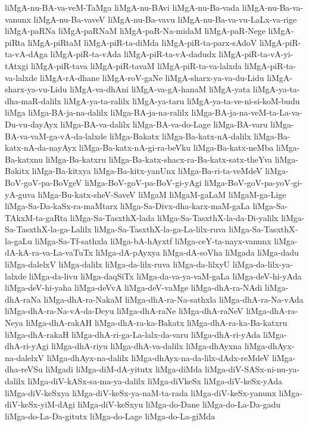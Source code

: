 {liMgA-nu-BA-va-veM-TaMga
liMgA-nu-BAvi
liMgA-nu-Ba-vada
liMgA-nu-Ba-va-vanunx
liMgA-nu-Ba-vaveV
liMgA-nu-Ba-vavu
liMgA-nu-Ba-va-vu-LaLx-va-rige
liMgA-paRNa
liMgA-paRNaM
liMgA-paR-Na-midaM
liMgA-paR-Nege
liMgA-piRta
liMgA-piRtaM
liMgA-piR-ta-diMda
liMgA-piR-ta-parx-sAdoV
liMgA-piR-ta-vA-dAga
liMgA-piR-ta-vAda
liMgA-piR-ta-vA-dadudx
liMgA-piR-ta-vA-yi-tAtxgi
liMgA-piR-tava
liMgA-piR-tavaM
liMgA-piR-ta-va-lalxda
liMgA-piR-ta-va-lalxde
liMgA-rA-dhane
liMgA-roV-gaNe
liMgA-sharx-ya-va-du-Lidu
liMgA-sharx-ya-vu-Lidu
liMgA-va-dhAni
liMgA-va-gA-hanaM
liMgA-yata
liMgA-ya-ta-dha-maR-dalilx
liMgA-ya-ta-ralilx
liMgA-ya-taru
liMgA-ya-ta-ve-ni-si-koM-budu
liMga
liMga-BA-ja-na-dalilx
liMga-BA-ja-na-ralilx
liMga-BA-ja-na-veM-ta-La-va-Du-vu-dayAyx
liMga-BA-va-dalilx
liMga-BA-va-do-Lage
liMga-BA-varu
liMga-BA-va-vaM-ga-vA-da-lalxde
liMga-Bakatx
liMga-Ba-katx-nA-dalilx
liMga-Ba-katx-nA-da-nayAyx
liMga-Ba-katx-nA-gi-ra-beVku
liMga-Ba-katx-neMba
liMga-Ba-katxnu
liMga-Ba-katxru
liMga-Ba-katx-shacx-ra-Ba-katx-satx-theYva
liMga-Bakitx
liMga-Ba-kitxya
liMga-Ba-kitx-yanUnx
liMga-Ba-ri-ta-veMdeV
liMga-BoV-goV-pa-BoVgeV
liMga-BoV-goV-pa-BoV-gi-yAgi
liMga-BoV-goV-pa-yoV-gi-yA-guva
liMga-Bu-katx-sheV-SaveV
liMgaM
liMgaM-gaLaM
liMgaM-ga-Lige
liMga-Sa-Da-kaSx-ra-maMtarx
liMga-Sa-Divx-dha-karx-maM-gaLa
liMga-Sa-TAkxM-ta-gaRta
liMga-Sa-TasxthX-lada
liMga-Sa-TasxthX-la-da-Di-yalilx
liMga-Sa-TasxthX-la-ga-Lalilx
liMga-Sa-TasxthX-la-ga-La-lilx-ruva
liMga-Sa-TasxthX-la-gaLu
liMga-Sa-Tf-sathxla
liMga-bA-hAyxtf
liMga-ceY-ta-nayx-vanunx
liMga-dA-kA-ra-va-La-vaTuTx
liMga-dA-pAyxya
liMga-dA-soVha
liMgada
liMga-dadu
liMga-dalelxV
liMga-dalilx
liMga-da-lilx-ruva
liMga-da-lilxyU
liMga-da-lilx-ya-lalxde
liMga-da-livu
liMga-daqSiTx
liMga-da-va-ya-vaM-gaLa
liMga-deV-hi-yAda
liMga-deV-hi-yaha
liMga-deVvA
liMga-deV-vaMge
liMga-dhA-ra-NAdi
liMga-dhA-raNa
liMga-dhA-ra-NakaM
liMga-dhA-ra-Na-sathxla
liMga-dhA-ra-Na-vAda
liMga-dhA-ra-Na-vA-da-Deyu
liMga-dhA-raNe
liMga-dhA-raNeV
liMga-dhA-ra-Neya
liMga-dhA-rakAH
liMga-dhA-ra-ka-Bakatx
liMga-dhA-ra-ka-Ba-katxru
liMga-dhA-rakaH
liMga-dhA-ri-ga-La-lalx-da-varu
liMga-dhA-ri-yAda
liMga-dhA-ri-yAgi
liMga-dhA-riyu
liMga-dhA-va-dalilx
liMga-dhAyxna
liMga-dhAyx-na-dalelxV
liMga-dhAyx-na-dalilx
liMga-dhAyx-na-da-lilx-dAdx-reMdeV
liMga-dha-reVSu
liMgadi
liMga-diM-dA-yitutx
liMga-diMda
liMga-diV-SASx-ni-nu-ya-dalilx
liMga-diV-kASx-sa-ma-ya-dalilx
liMga-diVkeSx
liMga-diV-keSx-yAda
liMga-diV-keSxya
liMga-diV-keSx-ya-naM-ta-rada
liMga-diV-keSx-yanunx
liMga-diV-keSx-yiM-dAgi
liMga-diV-keSxyu
liMga-do-Dane
liMga-do-La-Da-gadu
liMga-do-La-Da-gitutx
liMga-do-Lage
liMga-do-La-giMda
}
